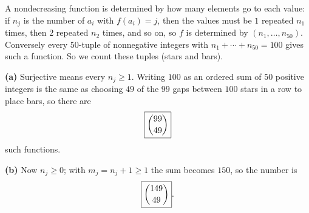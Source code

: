 A nondecreasing function is determined by how many elements go to each value: if $n_j$ is the number of $a_i$ with $f(a_i)=j$, then the values must be $1$ repeated $n_1$ times, then $2$ repeated $n_2$ times, and so on, so $f$ is determined by $(n_1,\dots,n_{50})$. Conversely every $50$-tuple of nonnegative integers with $n_1+\cdots+n_{50}=100$ gives such a function. So we count these tuples (stars and bars).

\textbf{(a)} Surjective means every $n_j\ge1$. Writing $100$ as an ordered sum of $50$ positive integers is the same as choosing $49$ of the $99$ gaps between $100$ stars in a row to place bars, so there are
\[
\boxed{\dbinom{99}{49}}
\]
such functions.

\textbf{(b)} Now $n_j\ge0$; with $m_j=n_j+1\ge1$ the sum becomes $150$, so the number is
\[
\boxed{\dbinom{149}{49}} .
\]
